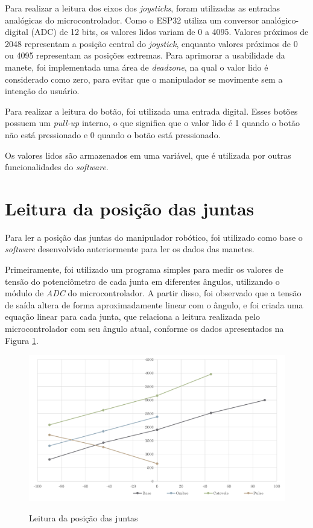 Para realizar a leitura dos eixos dos \textit{joysticks}, foram utilizadas as entradas analógicas do microcontrolador.
Como o ESP32 utiliza um conversor analógico-digital (ADC) de 12 bits, os valores lidos variam de 0 a 4095.
Valores próximos de 2048 representam a posição central do \textit{joystick}, enquanto valores próximos de 0 ou 4095 representam as posições extremas.
Para aprimorar a usabilidade da manete, foi implementada uma área de \textit{deadzone}, na qual o valor lido é considerado como zero,
para evitar que o manipulador se movimente sem a intenção do usuário.

Para realizar a leitura do botão, foi utilizada uma entrada digital.
Esses botões possuem um \textit{pull-up} interno, o que significa que o valor lido é 1 quando o botão não está pressionado e 0 quando o botão está pressionado.

Os valores lidos são armazenados em uma variável, que é utilizada por outras funcionalidades do \textit{software}.

\section[Leitura da posição das juntas]{Leitura da posição das juntas}
\label{sec:leituraPosicaoJuntas}

Para ler a posição das juntas do manipulador robótico, foi utilizado como base o \textit{software} desenvolvido anteriormente para ler os dados das manetes.

Primeiramente, foi utilizado um programa simples para medir os valores de tensão do potenciômetro de cada junta em diferentes ângulos, utilizando o módulo de \textit{ADC} do microcontrolador.
A partir disso, foi observado que a tensão de saída altera de forma aproximadamente linear com o ângulo,
e foi criada uma equação linear para cada junta, que relaciona a leitura realizada pelo microcontrolador com seu ângulo atual,
conforme os dados apresentados na Figura \ref{fig:leituraJuntas}.

\begin{figure}[H]
    \centering
    \caption{Leitura da posição das juntas}
    \includegraphics[keepaspectratio=true, width=\textwidth]
    	{img/leitura-juntas.png}
    \label{fig:leituraJuntas}
\end{figure}

